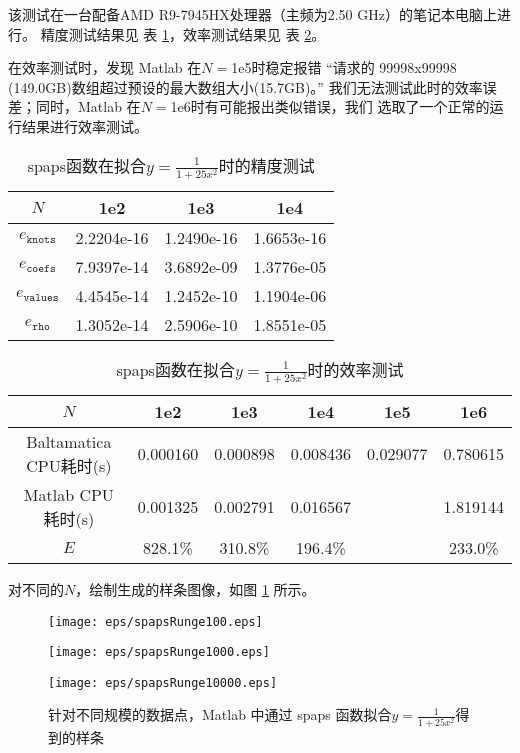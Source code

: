 该测试在一台配备AMD R9-7945HX处理器（主频为2.50 GHz）的笔记本电脑上进行。
精度测试结果见
表 \ref{tab:FINALspapsRungeacc}，效率测试结果见
表 \ref{tab:FINALspapsRungetime}。

在效率测试时，发现 Matlab 在$N=$1e5时稳定报错
“请求的 99998x99998 (149.0GB)数组超过预设的最大数组大小(15.7GB)。”
我们无法测试此时的效率误差；同时，Matlab 在$N=$1e6时有可能报出类似错误，我们
选取了一个正常的运行结果进行效率测试。

\begin{table}[htbp]
  \centering
  \caption{\label{tab:FINALspapsRungeacc}spaps函数在拟合$y=\frac{1}{1+25x^{2}}$时的精度测试}
  \begin{tabular}{cccc}
    \hline
    $N$& 1e2 & 1e3 & 1e4\\
    \hline
    $e_{\texttt{knots}}$&2.2204e-16&1.2490e-16&1.6653e-16\\
    $e_{\texttt{coefs}}$&7.9397e-14& 3.6892e-09&1.3776e-05\\
    $e_{\texttt{values}}$&4.4545e-14& 1.2452e-10& 1.1904e-06\\
    $e_{\texttt{rho}}$&1.3052e-14&2.5906e-10&  1.8551e-05\\
    \hline
  \end{tabular}
\end{table}

\begin{table}[htbp]
  \centering
  \caption{\label{tab:FINALspapsRungetime}spaps函数在拟合$y=\frac{1}{1+25x^{2}}$时的效率测试}
  \begin{tabular}{cccccc}
    \hline
    $N$&1e2&1e3&1e4&1e5&1e6\\
    \hline
    Baltamatica CPU耗时(s)& 0.000160& 0.000898& 0.008436&0.029077&0.780615\\
    Matlab CPU耗时(s)&0.001325&0.002791&0.016567&&1.819144\\
    $E$&828.1\%&310.8\%&196.4\%&&233.0\%\\
    \hline
  \end{tabular}
\end{table}

对不同的$N$，绘制生成的样条图像，如图 \ref{fig:FINALspapsRunge} 所示。

\begin{figure}[h]  
  \centering   
  \begin{minipage}{0.3\textwidth}  
    \centering  
    \texttt{[image: eps/spapsRunge100.eps]}  
    \caption*{$N=100$}  
  \end{minipage}  
  \hfill  
  \begin{minipage}{0.3\textwidth}  
    \centering  
    \texttt{[image: eps/spapsRunge1000.eps]}  
    \caption*{$N=1000$}  
  \end{minipage}
  \hfill  
  \begin{minipage}{0.3\textwidth}  
    \centering  
    \texttt{[image: eps/spapsRunge10000.eps]}  
    \caption*{$N=10000$}  
  \end{minipage}   
  \caption{针对不同规模的数据点，Matlab 中通过 spaps 函数拟合$y=\frac{1}{1+25x^{2}}$得到的样条}
  \label{fig:FINALspapsRunge}  
\end{figure}

